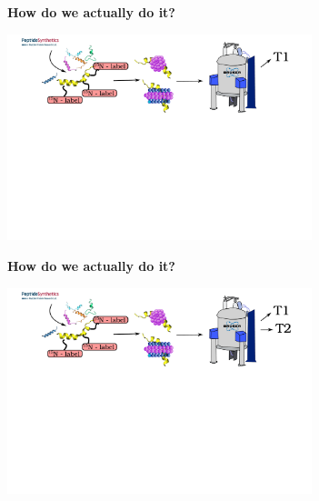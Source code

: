 \documentclass{beamer}
\begin{document}
\addtocounter{framenumber}{-1}
\begin{frame}
\begin{center}
\Large{\centering
\textbf{How do we actually do it?} \\}

\vspace{0.5cm}

\includegraphics[height=6cm]{what_we_do8.pdf}
\end{center}
\end{frame}



\addtocounter{framenumber}{-1}
\begin{frame}
\begin{center}
\Large{\centering
\textbf{How do we actually do it?} \\}

\vspace{0.5cm}

\includegraphics[height=6cm]{what_we_do7.pdf}
\end{center}
\end{frame}
\end{document}
